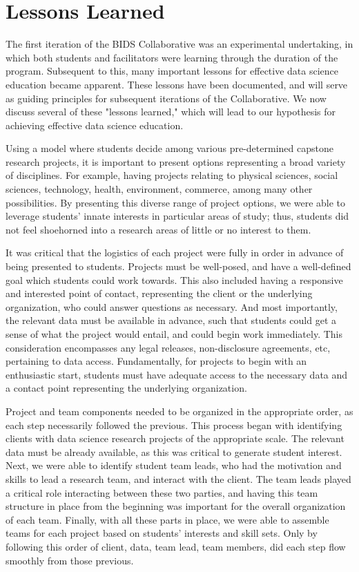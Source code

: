 \documentclass{sig-alternate}
\begin{document}


\section{Lessons Learned}

The first iteration of the BIDS Collaborative was an experimental undertaking, in which both students and facilitators were learning through the duration of the program.  Subsequent to this, many important lessons for effective data science education became apparent.  These lessons have been documented, and will serve as guiding principles for subsequent iterations of the Collaborative. We now discuss several of these "lessons learned," which will lead to our hypothesis for achieving effective data science education.

Using a model where students decide among various pre-determined capstone research projects, it is important to present options representing a broad variety of disciplines.  For example, having projects relating to physical sciences, social sciences, technology, health, environment, commerce, among many other possibilities.  By presenting this diverse range of project options, we were able to leverage students' innate interests in particular areas of study; thus, students did not feel shoehorned into a research areas of little or no interest to them.

It was critical that the logistics of each project were fully in order in advance of being presented to students.  Projects must be well-posed, and have a well-defined goal which students could work towards.  This also included having a responsive and interested point of contact, representing the client or the underlying organization, who could answer questions as necessary.  And most importantly, the relevant data must be available in advance, such that students could get a sense of what the project would entail, and could begin work immediately.  This consideration encompasses any legal releases, non-disclosure agreements, etc, pertaining to data access.  Fundamentally, for projects to begin with an enthusiastic start, students must have adequate access to the necessary data and a contact point representing the underlying organization.

Project and team components needed to be organized in the appropriate order, as each step necessarily followed the previous.  This process began with identifying clients with data science research projects of the appropriate scale.  The relevant data must be already available, as this was critical to generate student interest.  Next, we were able to identify student team leads, who had the motivation and skills to lead a research team, and interact with the client.  The team leads played a critical role interacting between these two parties, and having this team structure in place from the beginning was important for the overall organization of each team.  Finally, with all these parts in place, we were able to assemble teams for each project based on students' interests and skill sets.  Only by following this order of client, data, team lead, team members, did each step flow smoothly from those previous.
\end{document}
